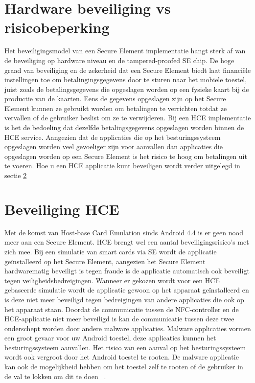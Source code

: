 \section{Hardware beveiliging vs risicobeperking}
\label{sec:hardwareEnRisico}
Het beveiligingsmodel van een Secure Element implementatie hangt sterk af van de beveiliging op hardware niveau en de tampered-proofed SE chip. De hoge graad van beveiliging en de zekerheid dat een Secure Element biedt laat financiële instellingen toe om betalingingsgegevens door te sturen naar het mobiele toestel, juist zoals de betalingsgegevens die opgeslagen worden op een fysieke kaart bij de productie van de kaarten. Eens de gegevens opgeslagen zijn op het Secure Element kunnen ze gebruikt worden om betalingen te verrichten totdat ze vervallen of de gebruiker beslist om ze te verwijderen. Bij een HCE implementatie is het de bedoeling dat dezelfde betalingsgegevens opgeslagen worden binnen de HCE service. Aangezien dat de applicaties die op het besturingssysteem opgeslagen worden veel gevoeliger zijn voor aanvallen dan applicaties die opgeslagen worden op een Secure Element is het risico te hoog om betalingen uit te voeren. Hoe u een HCE applicatie kunt beveiligen wordt verder uitgelegd in sectie \ref{sec:Beveiliging} ~\autocite{SCA2014}



\section{Beveiliging HCE}
\label{sec:Beveiliging}
Met de komst van Host-base Card Emulation sinds Android 4.4 is er geen nood meer aan een Secure Element. HCE brengt wel een aantal beveiligingsrisico's met zich mee. Bij een simulatie van smart cards via SE wordt de applicatie geïnstalleerd op het Secure Element, aangezien het Secure Element hardwarematig beveiligt is tegen fraude is de applicatie automatisch ook beveiligt tegen veiligheidsbedreigingen. Wanneer er gekozen wordt voor een HCE gebaseerde simulatie wordt de applicatie gewoon op het apparaat geïnstalleerd en is deze niet meer beveiligd tegen bedreigingen van andere applicaties die ook op het apparaat staan.
Doordat de communicatie tussen de NFC-controller en de HCE-applicatie niet meer beveiligd is kan de communicatie tussen deze twee onderschept worden door andere malware applicaties. Malware applicaties vormen een groot gevaar voor uw Android toestel, deze applicaties kunnen het besturingssysteem aanvallen. Het risico van een aanval op het besturingssysteem wordt ook vergroot door het Android toestel te rooten. De malware applicatie kan ook de mogelijkheid hebben om het toestel zelf te rooten of de gebruiker in de val te lokken om dit te doen ~\autocite{SCA2014}.


